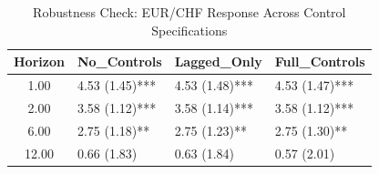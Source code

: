 \begin{table}[ht]
\centering
\caption{Robustness Check: EUR/CHF Response Across Control Specifications} 
\label{tab:robust_controls_fx}
\begin{tabular}{clll}
  \toprule
Horizon & No_Controls & Lagged_Only & Full_Controls \\ 
  \midrule
1.00 & 4.53 (1.45)*** & 4.53 (1.48)*** & 4.53 (1.47)*** \\ 
  2.00 & 3.58 (1.12)*** & 3.58 (1.14)*** & 3.58 (1.12)*** \\ 
  6.00 & 2.75 (1.18)** & 2.75 (1.23)** & 2.75 (1.30)** \\ 
  12.00 & 0.66 (1.83) & 0.63 (1.84) & 0.57 (2.01) \\ 
   \bottomrule
\end{tabular}
\end{table}
